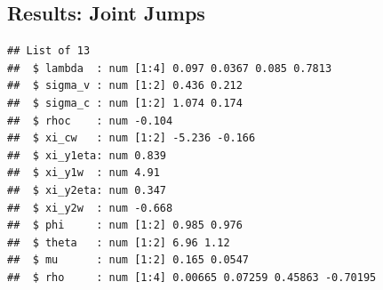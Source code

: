 \documentclass{article}\usepackage[]{graphicx}\usepackage[]{color}
\makeatletter
\newenvironment{kframe}{%
 \def\at@end@of@kframe{}%
 \ifinner\ifhmode%
  \def\at@end@of@kframe{\end{minipage}}%
  \begin{minipage}{\columnwidth}%
 \fi\fi%
 \def\FrameCommand##1{\hskip\@totalleftmargin \hskip-\fboxsep
 \colorbox{shadecolor}{##1}\hskip-\fboxsep
     \hskip-\linewidth \hskip-\@totalleftmargin \hskip\columnwidth}%
 \MakeFramed {\advance\hsize-\width
   \@totalleftmargin\z@ \linewidth\hsize
   \@setminipage}}%
 {\par\unskip\endMakeFramed%
 \at@end@of@kframe}
\newenvironment{knitrout}{}{} %
\makeatother
\begin{document}
\subsection{Results: Joint Jumps}
\begin{knitrout}
\color{fgcolor}\begin{kframe}


{\ttfamily\noindent\itshape\color{messagecolor}{\#\# \\\#\# Attaching package: 'dplyr'}}

{\ttfamily\noindent\itshape\color{messagecolor}{\#\# The following objects are masked from 'package:stats':\\\#\# \\\#\# \ \ \ \ filter, lag}}

{\ttfamily\noindent\itshape\color{messagecolor}{\#\# The following objects are masked from 'package:base':\\\#\# \\\#\# \ \ \ \ intersect, setdiff, setequal, union}}\begin{verbatim}
## List of 13
##  $ lambda  : num [1:4] 0.097 0.0367 0.085 0.7813
##  $ sigma_v : num [1:2] 0.436 0.212
##  $ sigma_c : num [1:2] 1.074 0.174
##  $ rhoc    : num -0.104
##  $ xi_cw   : num [1:2] -5.236 -0.166
##  $ xi_y1eta: num 0.839
##  $ xi_y1w  : num 4.91
##  $ xi_y2eta: num 0.347
##  $ xi_y2w  : num -0.668
##  $ phi     : num [1:2] 0.985 0.976
##  $ theta   : num [1:2] 6.96 1.12
##  $ mu      : num [1:2] 0.165 0.0547
##  $ rho     : num [1:4] 0.00665 0.07259 0.45863 -0.70195
\end{verbatim}
\end{kframe}
\end{knitrout}

\clearpage
\newpage
\end{document}
